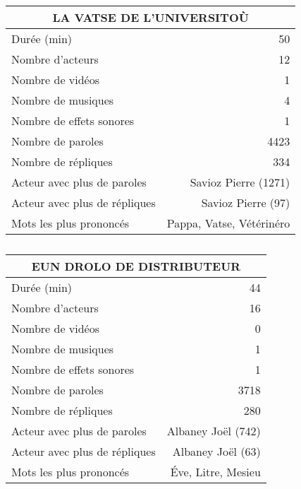     \begin{table}[]
    \centering
    \caption{}
    \begin{tabular}{lr}\toprule\multicolumn{2}{c}{LA VATSE DE L’UNIVERSITOÙ} \\\midrule
\multicolumn{1}{l}{Durée (min)}&50\\
\multicolumn{1}{l}{Nombre d'acteurs}&12\\
\multicolumn{1}{l}{Nombre de vidéos}&1\\
\multicolumn{1}{l}{Nombre de musiques}&4\\
\multicolumn{1}{l}{Nombre de effets sonores}&1\\
\multicolumn{1}{l}{Nombre de paroles}&4423\\
\multicolumn{1}{l}{Nombre de répliques}&334\\
\multicolumn{1}{l}{Acteur avec plus de paroles}&Savioz Pierre (1271)\\
\multicolumn{1}{l}{Acteur avec plus de répliques}&Savioz Pierre (97)\\
\multicolumn{1}{l}{Mots les plus prononcés}&Pappa, Vatse, Vétérinéro\\
    \bottomrule
    \end{tabular}%
    \end{table}
    \begin{table}[]
    \centering
    \caption{}
    \begin{tabular}{lr}\toprule\multicolumn{2}{c}{EUN DROLO DE DISTRIBUTEUR} \\\midrule
\multicolumn{1}{l}{Durée (min)}&44\\
\multicolumn{1}{l}{Nombre d'acteurs}&16\\
\multicolumn{1}{l}{Nombre de vidéos}&0\\
\multicolumn{1}{l}{Nombre de musiques}&1\\
\multicolumn{1}{l}{Nombre de effets sonores}&1\\
\multicolumn{1}{l}{Nombre de paroles}&3718\\
\multicolumn{1}{l}{Nombre de répliques}&280\\
\multicolumn{1}{l}{Acteur avec plus de paroles}&Albaney Joël (742)\\
\multicolumn{1}{l}{Acteur avec plus de répliques}&Albaney Joël (63)\\
\multicolumn{1}{l}{Mots les plus prononcés}&Éve, Litre, Mesieu\\
    \bottomrule
    \end{tabular}%
    \end{table}
